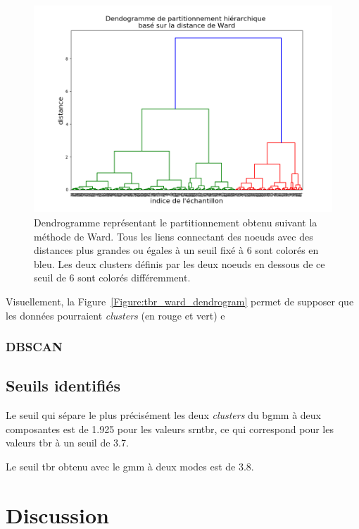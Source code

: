 \begin{figure}[h!]
  \centering
	\includegraphics[width=1.0\linewidth]{figures/chapter-4/tbr-dendrogram-ward} 
  \caption{Dendrogramme représentant le partitionnement obtenu suivant la méthode de Ward. Tous les liens connectant des noeuds avec des distances plus 
	grandes ou égales à un seuil fixé à 6 sont colorés en bleu. Les deux clusters définis par les deux noeuds en dessous de ce seuil de 6 sont colorés différemment.}
  \label{Figure:tbr_bgmm}
\end{figure}

Visuellement, la Figure~\ref{Figure:tbr_ward_dendrogram} permet de supposer que les données pourraient \textit{clusters} (en rouge et vert) e

\subsubsection{DBSCAN}

\subsection{Seuils identifiés}
Le seuil qui sépare le plus précisément les deux \textit{clusters} du \gls{bgmm} à deux composantes est de 1.925 pour les valeurs \gls{srntbr},
ce qui correspond pour les valeurs \gls{tbr} à un seuil de 3.7.

Le seuil \gls{tbr} obtenu avec le \gls{gmm} à deux modes est de 3.8. 

\section{Discussion}

